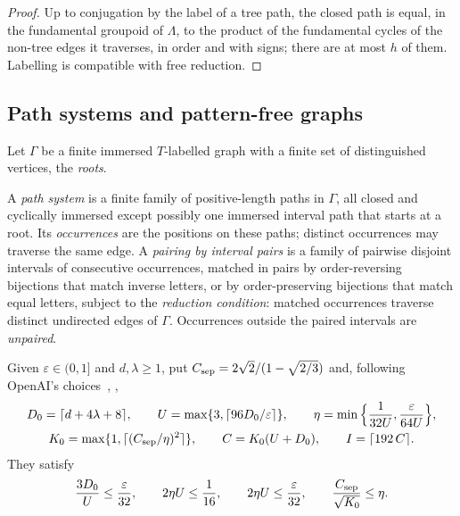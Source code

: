 \documentclass[11pt]{article}
\theoremstyle{definition}
\theoremstyle{plain}
\newcommand{\eps}{\varepsilon}
\begin{document}
\begin{proof}
Up to conjugation by the label of a tree path, the closed path is equal, in the fundamental groupoid of $\Lambda$, to the product of the fundamental cycles of the non-tree edges it traverses, in order and with signs; there are at most $h$ of them. Labelling is compatible with free reduction.
\end{proof}

\subsection{Path systems and pattern-free graphs}
Let $\Gamma$ be a finite immersed $T$-labelled graph with a finite set of distinguished vertices, the \emph{roots}.

\begin{definition}\label{def:system}
A \emph{path system} is a finite family of positive-length paths in $\Gamma$, all closed and cyclically immersed except possibly one immersed interval path that starts at a root. Its \emph{occurrences} are the positions on these paths; distinct occurrences may traverse the same edge. A \emph{pairing by interval pairs} is a family of pairwise disjoint intervals of consecutive occurrences, matched in pairs by order-reversing bijections that match inverse letters, or by order-preserving bijections that match equal letters, subject to the \emph{reduction condition}: matched occurrences traverse distinct undirected edges of $\Gamma$. Occurrences outside the paired intervals are \emph{unpaired}.
\end{definition}

Given $\eps\in(0,1]$ and $d,\lambda\ge1$, put $C_{\rm sep}=2\sqrt2/(1-\sqrt{2/3})$ and, following OpenAI's choices~\cite[Lemma~4.2 and (4.3)]{OAI196}, \cite[Lemma~5.3 and (5.3)]{OAI197a},
\begin{equation}\label{eq:constants}
\begin{gathered}
D_0=\lceil d+4\lambda+8\rceil,\qquad U=\max\{3,\lceil 96D_0/\eps\rceil\},\qquad \eta=\min\Big\{\frac1{32U},\frac{\eps}{64U}\Big\},\\
K_0=\max\{1,\lceil (C_{\rm sep}/\eta)^2\rceil\},\qquad C=K_0(U+D_0),\qquad I=\lceil 192\,C\rceil .
\end{gathered}
\end{equation}
They satisfy
\begin{equation}\label{eq:constineq}
\frac{3D_0}{U}\le\frac{\eps}{32},\qquad 2\eta U\le\frac1{16},\qquad 2\eta U\le\frac{\eps}{32},\qquad \frac{C_{\rm sep}}{\sqrt{K_0}}\le\eta .
\end{equation}
\end{document}
